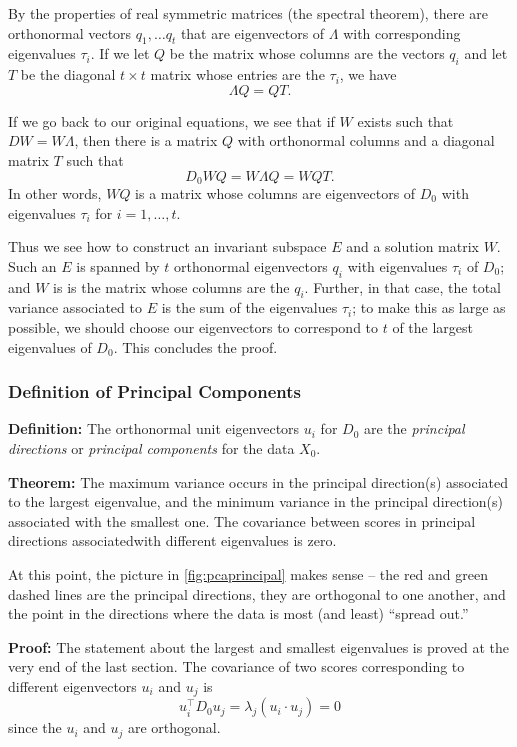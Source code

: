 \documentclass[
]{article}
\begin{document}
By the properties of real symmetric matrices (the spectral theorem),
there are orthonormal vectors \(q_{1},\ldots q_{t}\) that are
eigenvectors of \(\Lambda\) with corresponding eigenvalues \(\tau_{i}\).
If we let \(Q\) be the matrix whose columns are the vectors \(q_{i}\)
and let \(T\) be the diagonal \(t\times t\) matrix whose entries are the
\(\tau_{i}\), we have \[
\Lambda Q = QT.
\]

If we go back to our original equations, we see that if \(W\) exists
such that \(DW=W\Lambda\), then there is a matrix \(Q\) with orthonormal
columns and a diagonal matrix \(T\) such that \[
D_{0}WQ = W\Lambda Q = W Q T.
\] In other words, \(WQ\) is a matrix whose columns are eigenvectors of
\(D_{0}\) with eigenvalues \(\tau_{i}\) for \(i=1,\ldots, t\).

Thus we see how to construct an invariant subspace \(E\) and a solution
matrix \(W\). Such an \(E\) is spanned by \(t\) orthonormal eigenvectors
\(q_{i}\) with eigenvalues \(\tau_{i}\) of \(D_{0}\); and \(W\) is is
the matrix whose columns are the \(q_{i}\). Further, in that case, the
total variance associated to \(E\) is the sum of the eigenvalues
\(\tau_{i}\); to make this as large as possible, we should choose our
eigenvectors to correspond to \(t\) of the largest eigenvalues of
\(D_{0}\). This concludes the proof.

\hypertarget{definition-of-principal-components}{%
\subsubsection{Definition of Principal
Components}\label{definition-of-principal-components}}

\textbf{Definition:} The orthonormal unit eigenvectors \(u_{i}\) for
\(D_{0}\) are the \emph{principal directions} or \emph{principal
components} for the data \(X_{0}\).

\textbf{Theorem:} The maximum variance occurs in the principal
direction(s) associated to the largest eigenvalue, and the minimum
variance in the principal direction(s) associated with the smallest one.
The covariance between scores in principal directions associatedwith
different eigenvalues is zero.

At this point, the picture in \cref{fig:pcaprincipal} makes sense -- the
red and green dashed lines are the principal directions, they are
orthogonal to one another, and the point in the directions where the
data is most (and least) ``spread out.''

\textbf{Proof:} The statement about the largest and smallest eigenvalues
is proved at the very end of the last section. The covariance of two
scores corresponding to different eigenvectors \(u_{i}\) and \(u_{j}\)
is \[u_{i}^{\intercal}D_{0}u_{j} = \lambda_{j}(u_{i}\cdot u_{j}) = 0\]
since the \(u_{i}\) and \(u_{j}\) are orthogonal.
\end{document}
